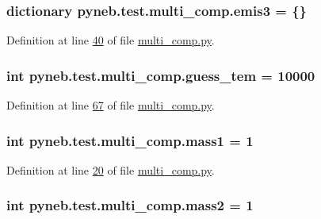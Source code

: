 \subsubsection[{emis3}]{\setlength{\rightskip}{0pt plus 5cm}dictionary pyneb.\+test.\+multi\+\_\+comp.\+emis3 = \{\}}\label{namespacepyneb_1_1test_1_1multi__comp_aefc15ba67ef2411cad13adcc08d97d41}


Definition at line \hyperlink{multi__comp_8py_source_l00040}{40} of file \hyperlink{multi__comp_8py_source}{multi\+\_\+comp.\+py}.

\hypertarget{namespacepyneb_1_1test_1_1multi__comp_a727ee7c8e06d8c8f88ee5ca2989968a2}{}
\subsubsection[{guess\+\_\+tem}]{\setlength{\rightskip}{0pt plus 5cm}int pyneb.\+test.\+multi\+\_\+comp.\+guess\+\_\+tem = 10000}\label{namespacepyneb_1_1test_1_1multi__comp_a727ee7c8e06d8c8f88ee5ca2989968a2}


Definition at line \hyperlink{multi__comp_8py_source_l00067}{67} of file \hyperlink{multi__comp_8py_source}{multi\+\_\+comp.\+py}.

\hypertarget{namespacepyneb_1_1test_1_1multi__comp_a0f4f1d8d7cca8ff5626b7e39261d92d5}{}
\subsubsection[{mass1}]{\setlength{\rightskip}{0pt plus 5cm}int pyneb.\+test.\+multi\+\_\+comp.\+mass1 = 1}\label{namespacepyneb_1_1test_1_1multi__comp_a0f4f1d8d7cca8ff5626b7e39261d92d5}


Definition at line \hyperlink{multi__comp_8py_source_l00020}{20} of file \hyperlink{multi__comp_8py_source}{multi\+\_\+comp.\+py}.

\hypertarget{namespacepyneb_1_1test_1_1multi__comp_ad8cdd898f34b451cac9f738570b8fde6}{}
\subsubsection[{mass2}]{\setlength{\rightskip}{0pt plus 5cm}int pyneb.\+test.\+multi\+\_\+comp.\+mass2 = 1}\label{namespacepyneb_1_1test_1_1multi__comp_ad8cdd898f34b451cac9f738570b8fde6}


